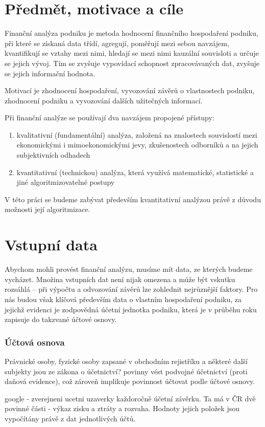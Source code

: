 \section{Předmět, motivace a cíle}
Finanční analýza podniku je metoda hodnocení finančního hospodaření podniku, při které se získaná data třídí, agregují, poměřují mezi sebou navzájem, kvantifikují se vztahy mezi nimi, hledají se mezi nimi kauzální souvisloti a určuje se jejich vývoj. Tím se zvyšuje vypovídací schopnost zpracovávaných dat, zvyšuje se jejich informační hodnota\cite{sedl}.

Motivací je zhodnocení hospodaření, vyvozování závěrů o vlastnostech podniku, zhodnocení podniku a vyvozování dalších užitečných informací.

Při finanční analýze se používají dva navzájem propojené přístupy\cite{kova}:
\begin{enumerate}
	\item kvalitativní (fundamentální) analýza, založená na znalostech souvislostí mezi ekonomickými i mimoekonomickými jevy, zkušenostech odborníků a na jejich subjektivních odhadech
	\item kvantitativní (technickou) analýza, která využívá matematické, statistické a jiné algoritmizovatelné postupy
\end{enumerate}
V této práci se budeme zabývat především kvantitativní analýzou právě z důvodu možnosti její algoritmizace.

\section{Vstupní data}
Abychom mohli provést finanční analýzu, musíme mít data, ze kterých budeme vycházet. Množina vstupních dat není nijak omezena a může být vskutku rozsáhlá -- při výpočtu a odvozování závěrů lze zohlednit nejrůznější faktory. Pro nás budou však klíčová především data o vlastním hospodaření podniku, za jejichž evidenci je zodpovědná účetní jednotka podniku, která je v průběhu roku zapisuje do takzvané účtové osnovy.
\subsubsection{Účtová osnova}
Právnické osoby, fyzické osoby zapsané v obchodním rejistříku a některé další subjekty jsou ze zákona o účetnictví? povinny vést podvojné účetnictví (proti daňová evidence), což zároveň implikuje povinnost účtovat podle účtové osnovy.

google - zverejneni ucetni uzaverky
každoročně účetní závěrku. Ta má v ČR dvě povinné části - výkaz zisku a ztráty a rozvaha. Hodnoty jejich položek jsou vypočítány právě z dat jednotlivých účtů.
